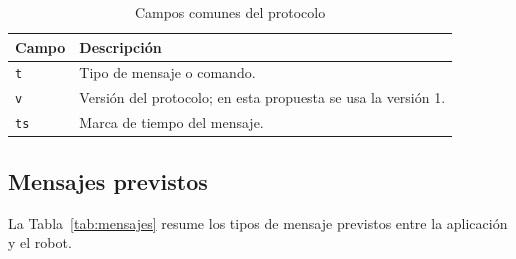 \documentclass[journal]{IEEEtran}
\begin{document}
\begin{table}[H]
\centering
\caption{Campos comunes del protocolo}
\label{tab:campos}
\scriptsize
\begin{tabular}{p{} p{}}
\toprule
\textbf{Campo} & \textbf{Descripción} \\
\midrule
\texttt{t} & Tipo de mensaje o comando. \\
\texttt{v} & Versión del protocolo; en esta propuesta se usa la versión 1. \\
\texttt{ts} & Marca de tiempo del mensaje. \\
\bottomrule
\end{tabular}
\end{table}

\subsection{Mensajes previstos}

La Tabla~\ref{tab:mensajes} resume los tipos de mensaje previstos entre la aplicación y el robot.
\end{document}
